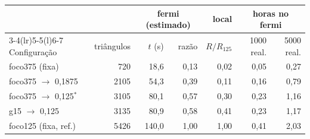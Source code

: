 \begin{tabular}{@{}l r r r r r r@{}}
\toprule
 & & \multicolumn{2}{c}{fermi (estimado)} & local & \multicolumn{2}{c}{horas no fermi} \\
\cmidrule(lr){3-4}\cmidrule(lr){5-5}\cmidrule(l){6-7}
Configuração & triângulos & $t$ (s) & razão & $R/R_{125}$ & \num{1000} real. & \num{5000} real. \\
\midrule
foco375 (fixa) & 720 & 18{,}6 & 0{,}13 & 0{,}02 & 0{,}05 & 0{,}27 \\
foco375 $\to$ 0,1875 & 2105 & 54{,}3 & 0{,}39 & 0{,}11 & 0{,}16 & 0{,}79 \\
foco375 $\to$ 0,125$^{*}$ & 3105 & 80{,}1 & 0{,}57 & 0{,}30 & 0{,}23 & 1{,}16 \\
g15 $\to$ 0,125 & 3135 & 80{,}9 & 0{,}58 & 0{,}41 & 0{,}23 & 1{,}17 \\
foco125 (fixa, ref.) & 5426 & 140{,}0 & 1{,}00 & 1{,}00 & 0{,}41 & 2{,}03 \\
\bottomrule
\end{tabular}
